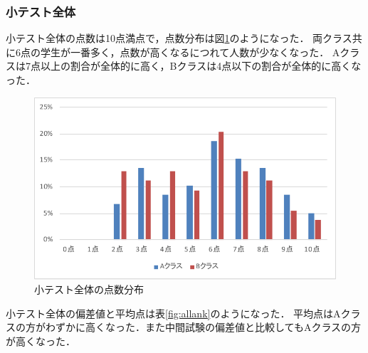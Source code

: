 \documentclass[a4j,12pt]{jsarticle}
\begin{document}
\begin{table}[H]
\centering
\caption{主単元の偏差値と平均点}
\label{fig:3ank}
\end{table}



\newpage
\subsubsection{小テスト全体}
小テスト全体の点数は10点満点で，点数分布は図\ref{fig:allten}のようになった．
両クラス共に6点の学生が一番多く，点数が高くなるにつれて人数が少なくなった．
Aクラスは7点以上の割合が全体的に高く，Bクラスは4点以下の割合が全体的に高くなった．

\begin{figure}[H]
\centering
\includegraphics[width=12cm]{123test.pdf}
\caption{小テスト全体の点数分布}
\label{fig:allten}
\end{figure}

小テスト全体の偏差値と平均点は表\ref{fig:allank}のようになった．
平均点はAクラスの方がわずかに高くなった．また中間試験の偏差値と比較してもAクラスの方が高くなった．\\
\end{document}
